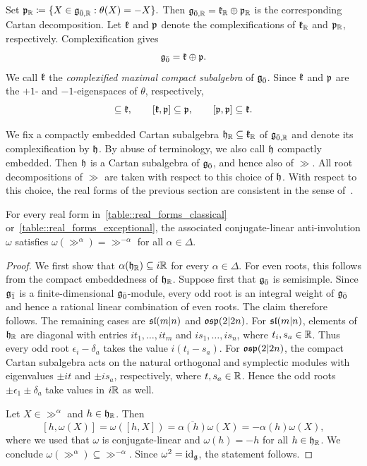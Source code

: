 Set
$
\pp_{\RR}\coloneqq\{X\in\gg_{\bar0,\RR}:\theta(X)=-X\}.
$
Then
$
\gg_{\bar0,\RR}=\kk_{\RR}\oplus\pp_{\RR}
$
is the corresponding Cartan decomposition. Let $\kk$ and $\pp$ denote the complexifications of $\kk_{\RR}$ and $\pp_{\RR}$, respectively. Complexification gives
\begin{equation}
\even=\kk\oplus\pp.
\end{equation}
We call $\kk$ the \emph{complexified maximal compact subalgebra} of $\even$. Since $\kk$ and $\pp$ are the $+1$- and $-1$-eigenspaces of $\theta$, respectively,
\begin{equation}
[\kk,\kk]\subseteq\kk,\qquad
[\kk,\pp]\subseteq\pp,\qquad
[\pp,\pp]\subseteq\kk.
\end{equation}

We fix a compactly embedded Cartan subalgebra $\hh_{\RR}\subseteq\kk_{\RR}$ of $\gg_{\bar0,\RR}$ and denote its complexification by $\hh$. By abuse of terminology, we also call $\hh$ compactly embedded. Then $\hh$ is a Cartan subalgebra of $\even$, and hence also of $\gg$. All root decompositions of $\gg$ are taken with respect to this choice of $\hh$. With respect to this choice, the real forms of the previous section are consistent in the sense of~\cite{jakobsen1994full}.

\begin{lemma}\label{lemm::consistent_omega}
For every real form in~\eqref{table::real_forms_classical} or~\eqref{table::real_forms_exceptional}, the associated conjugate-linear anti-involution $\omega$ satisfies $\omega(\gg^\alpha)=\gg^{-\alpha}$ for all $\alpha\in\Delta$.
\end{lemma}

\begin{proof}

We first show that $\alpha(\hh_{\RR})\subseteq i\RR$ for every $\alpha\in\Delta$. For even roots, this follows from the compact embeddedness of $\hh_{\RR}$. Suppose first that $\even$ is semisimple. Since $\odd$ is a finite-dimensional $\even$-module, every odd root is an integral weight of $\even$ and hence a rational linear combination of even roots. The claim therefore follows. The remaining cases are $\sl(m\vert n)$ and $\osp(2\vert2n)$. For $\sl(m\vert n)$, elements of $\hh_{\RR}$ are diagonal with entries $it_1,\ldots,it_m$ and $is_1,\ldots,is_n$, where $t_i,s_a\in\RR$. Thus every odd root $\epsilon_i-\delta_a$ takes the value $i(t_i-s_a)$. For $\osp(2\vert2n)$, the compact Cartan subalgebra acts on the natural orthogonal and symplectic modules with eigenvalues $\pm it$ and $\pm is_a$, respectively, where $t,s_a\in\RR$. Hence the odd roots $\pm\epsilon_1\pm\delta_a$ take values in $i\RR$ as well.

Let $X\in\gg^\alpha$ and $h\in\hh_{\RR}$. Then
\[ [h,\omega(X)]=\omega([h,X])=\overline{\alpha(h)}\omega(X)
=-\alpha(h)\omega(X),\]
where we used that $\omega$ is conjugate-linear and $\omega(h)=-h$ for all $h \in \hh_{\RR}$. We conclude $\omega(\gg^\alpha)\subseteq\gg^{-\alpha}$. Since $\omega^{2}=\id_{\gg}$, the statement follows.
\end{proof}

